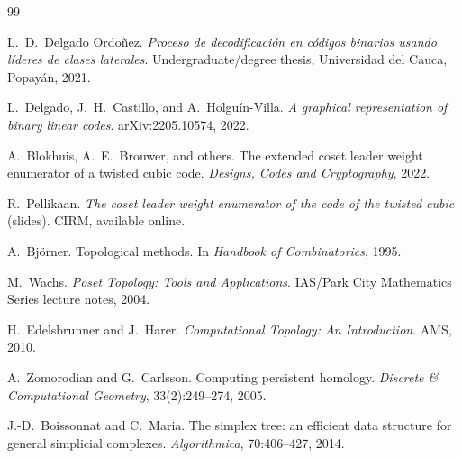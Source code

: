 \documentclass[11pt,twoside,leqno]{article}
\theoremstyle{definition}
\theoremstyle{plain}
\theoremstyle{remark}
\begin{document}
\begin{thebibliography}{99}

L.~D.~Delgado Ordo\~nez.
\newblock \emph{Proceso de decodificaci\'on en c\'odigos binarios usando l\'ideres de clases laterales}.
\newblock Undergraduate/degree thesis, Universidad del Cauca, Popay\'an, 2021.

L.~Delgado, J.~H.~Castillo, and A.~Holgu\'in-Villa.
\newblock \emph{A graphical representation of binary linear codes}.
\newblock arXiv:2205.10574, 2022.

A.~Blokhuis, A.~E.~Brouwer, and others.
\newblock The extended coset leader weight enumerator of a twisted cubic code.
\newblock \emph{Designs, Codes and Cryptography}, 2022.

R.~Pellikaan.
\newblock \emph{The coset leader weight enumerator of the code of the twisted cubic} (slides).
\newblock CIRM, available online.

A.~Bj{\"o}rner.
\newblock Topological methods.
\newblock In \emph{Handbook of Combinatorics}, 1995.

M.~Wachs.
\newblock \emph{Poset Topology: Tools and Applications}.
\newblock IAS/Park City Mathematics Series lecture notes, 2004.

H.~Edelsbrunner and J.~Harer.
\newblock \emph{Computational Topology: An Introduction}.
\newblock AMS, 2010.

A.~Zomorodian and G.~Carlsson.
\newblock Computing persistent homology.
\newblock \emph{Discrete \& Computational Geometry}, 33(2):249--274, 2005.

J.-D.~Boissonnat and C.~Maria.
\newblock The simplex tree: an efficient data structure for general simplicial complexes.
\newblock \emph{Algorithmica}, 70:406--427, 2014.

\end{thebibliography}
\end{document}
